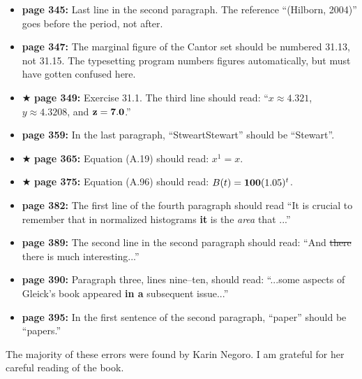 \documentclass[12pt]{article}
\begin{document}
\begin{itemize}
  \item {\bf page 345:}  Last line in the second paragraph.  The
    reference ``(Hilborn, 2004)'' goes before the period, not
    after. %

  \item {\bf page 347:}  The marginal figure of the Cantor set should
    be numbered 31.13, not 31.15.  The typesetting program numbers
    figures automatically, but must have gotten confused here.  

  \item $\bigstar$ {\bf page 349:}  Exercise 31.1.  The third line
    should read: ``$x \approx 4.321$, $y \approx 4.3208$, and ${\bf z
      = 7.0}$.''


  \item {\bf page 359:} In the last paragraph, ``StweartStewart''
    should be ``Stewart''. 

  \item $\bigstar$ {\bf page 365:}  Equation (A.19) should read: $x^1
    = x$.  

  \item $\bigstar$ {\bf page 375:}  Equation (A.96) should read: $B(t)
    = {\bf 100}(1.05)^t$.  

  \item {\bf page 382:}  The first line of the fourth paragraph should
    read ``It is crucial to remember that in normalized histograms
    {\bf it} is the {\em area}\/ that ...'' %

  \item {\bf page 389:} The second line in the second paragraph should
    read: ``And \sout{there} there is much interesting...''

  \item {\bf page 390:} Paragraph three, lines nine--ten, should read:
    ``...some aspects of Gleick's book appeared {\bf in a } subsequent
    issue...''  %

  \item {\bf page 395:} In the first sentence of the second paragraph,
    ``paper'' should be ``papers.''

\end{itemize}
\bigskip
The majority of these errors were found by Karin Negoro.  I am
grateful for her careful reading of the book. 
\end{document}
